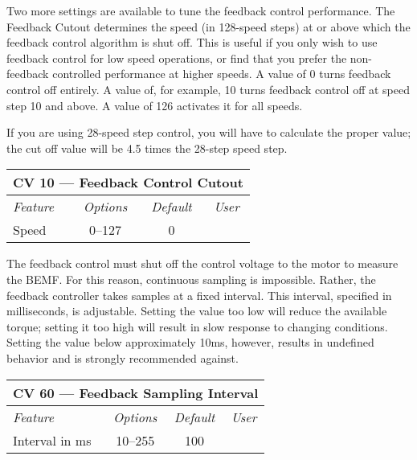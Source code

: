 \documentclass[12pt,letterpaper,draft]{memoir} %
\begin{document}
\label{FeedbackActivation}Two more settings are available to tune the feedback control performance. The Feedback Cutout determines the speed (in 128-speed steps) at or above which the feedback control algorithm is shut off. This is useful if you only wish to use feedback control for low speed operations, or find that you prefer the non-feedback controlled performance at higher speeds. A value of 0 turns feedback control off entirely. A value of, for example, 10 turns feedback control off at speed step 10 and above. A value of 126 activates it for all speeds.

If you are using 28-speed step control, you will have to calculate the proper value; the cut off value will be 4.5 times the 28-step speed step.

\label{CV10}
\begin{center}
\begin{tabular}{|l|c|c|c|}
\hline
\multicolumn{4}{|c|}{\textbf{CV 10 --- Feedback Control Cutout}} \\ \hline \hline
\textit{Feature} & \textit{Options} & \textit{Default} & \textit{User} \\ \hline
Speed & 0--127 & 0 &\\ \hline
\end{tabular}
\end{center}

The feedback control must shut off the control voltage to the motor to measure the BEMF. For this reason, continuous sampling is impossible. Rather, the feedback controller takes samples at a fixed interval. This interval, specified in milliseconds, is adjustable. Setting the value too low will reduce the available torque; setting it too high will result in slow response to changing conditions. Setting the value below approximately 10ms, however, results in undefined behavior and is strongly recommended against.

\label{CV60}
\begin{center}
\begin{tabular}{|l|c|c|c|}
\hline
\multicolumn{4}{|c|}{\textbf{CV 60 --- Feedback Sampling Interval}} \\ \hline \hline
\textit{Feature} & \textit{Options} & \textit{Default} & \textit{User} \\ \hline
Interval in ms & 10--255 & 100 &\\ \hline
\end{tabular}
\end{center}
\end{document}
